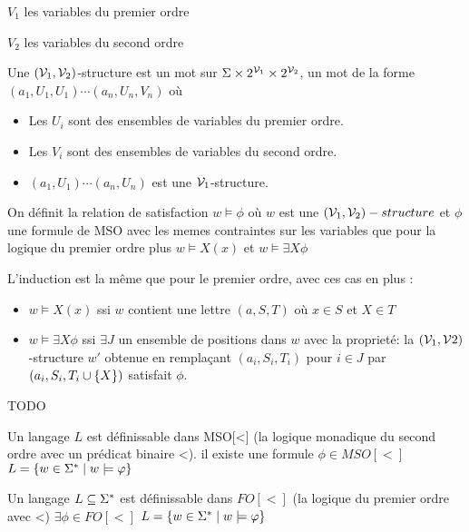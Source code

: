 $V_1$ les variables du premier ordre

$V_2$ les variables du second ordre


\begin{definition}
	Une $(\mathcal{V}_1,\mathcal{V}_2)$-structure est un mot sur $\Sigma \times 2^{\mathcal{V}_1} \times  2^{\mathcal{V}_2}$, \cad un mot de la forme
	$(a_1,U_1,U_1) \cdots (a_n,U_n,V_n)$ où
	\begin{itemize}
		\item Les $U_i$ sont des ensembles de variables du premier ordre.
		\item Les $V_i$ sont des ensembles de variables du second ordre.
		\item $(a_1,U_1) \cdots (a_n,U_n)$ est une $\mathcal{V}_1$-structure.
	\end{itemize}
\end{definition}

\begin{definition}
	On définit la relation de satisfaction $w \models \phi$ où $w$ est une $(\mathcal{V}_1, \mathcal{V}_2)-structure$ et $\phi$ une formule de
	MSO avec les memes contraintes sur les variables que pour la logique du premier ordre %
	plus $w \models X(x)$ et $w \models \exists X \phi$
\end{definition}

L'induction est la même que pour le premier ordre, avec ces cas en plus :
\begin{itemize}
	\item $w \models X (x)$ ssi $w$ contient une lettre $(a,S,T)$ où $x \in S$ et $X \in T$
	\item $w \models \exists X \phi$ ssi $\exists J$ un ensemble de positions dans $w$ avec la proprieté:
	      la $(\mathcal{V}_1, \mathcal{V}2)$-structure $w'$ obtenue en remplaçant $(a_i, S_i,T_i)$ pour $i \in J$ par $(a_i, S_i, T_i \cup \left\{X\right\})$ satisfait $\phi$.
\end{itemize}


\begin{exemple}
	TODO
\end{exemple}


\begin{definition}
	Un langage $L$ est définissable dans MSO[<] (la logique monadique du second ordre avec un prédicat binaire <).
	\ssi il existe une formule $\phi \in MSO[<]$ \tlq $L = \left\{w\in \Sigma^{*} \mid w \models \varphi\right\}$
\end{definition}

\begin{definition}
	Un langage $L \subseteq \Sigma^{*}$ est définissable dans $FO[<]$ (la logique du premier ordre avec <)
	\ssi $\exists \phi \in FO[<]$ \tlq $L = \left\{w \in \Sigma^{*} \mid w \models \varphi\right\}$
\end{definition}


